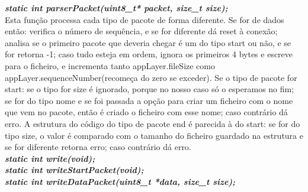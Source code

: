 \documentclass[a4paper]{article}
\begin{document}
\noindent\textbf{\textit{static int parserPacket(uint8\_t* packet, size\_t
size);}}\\ Esta função processa cada tipo de pacote de forma diferente. Se for
de dados então: verifica o número de sequência, e se for diferente dá reset à
conexão; analisa se o primeiro pacote que deveria chegar é um do tipo start ou
não, e se for retorna -1; caso tudo esteja em ordem, ignora os primeiros 4
bytes e escreve para o ficheiro, e incrementa tanto appLayer.fileSize como
appLayer.sequenceNumber(recomeça do zero se exceder). Se o tipo de pacote for start:
se o tipo for size é ignorado, porque no nosso caso só o esperamos no fim;
se for do tipo nome e se foi passada a opção para criar um ficheiro com o
nome que vem no pacote, então é criado o ficheiro com esse nome; caso contrário
dá erro. A estrutura do código do tipo de pacote end é parecida à do start: se
for do tipo size, o valor é comparado com o tamanho do ficheiro guardado na
estrutura e se for diferente retorna erro; caso contrário dá erro.\\

\noindent\textbf{\textit{static int write(void);}}\\

\noindent\textbf{\textit{static int writeStartPacket(void);}}\\

\noindent\textbf{\textit{static int writeDataPacket(uint8\_t *data, size\_t
size);}}\\
\end{document}
